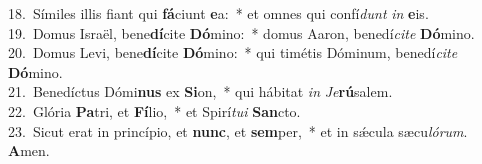 {18.~}Símiles illis fiant qui \textbf{fá}ciunt \textbf{e}a:~* et omnes qui confí\textit{dunt} \textit{in} \textbf{e}is.\\
{19.~}Domus Israël, bene\textbf{dí}cite \textbf{Dó}mino:~* domus Aaron, benedí\textit{ci}\textit{te} \textbf{Dó}mino.\\
{20.~}Domus Levi, bene\textbf{dí}cite \textbf{Dó}mino:~* qui timétis Dóminum, benedí\textit{ci}\textit{te} \textbf{Dó}mino.\\
{21.~}Benedíctus Dómi\textbf{nus} ex \textbf{Si}on,~* qui hábitat \textit{in} \textit{Je}\textbf{rú}salem.\\
{22.~}Glória \textbf{Pa}tri, et \textbf{Fí}lio,~* et Spirí\textit{tu}\textit{i} \textbf{San}cto.\\
{23.~}Sicut erat in princípio, et \textbf{nunc}, et \textbf{sem}per,~* et in sǽcula sæcu\textit{ló}\textit{rum}. \textbf{A}men.\\
